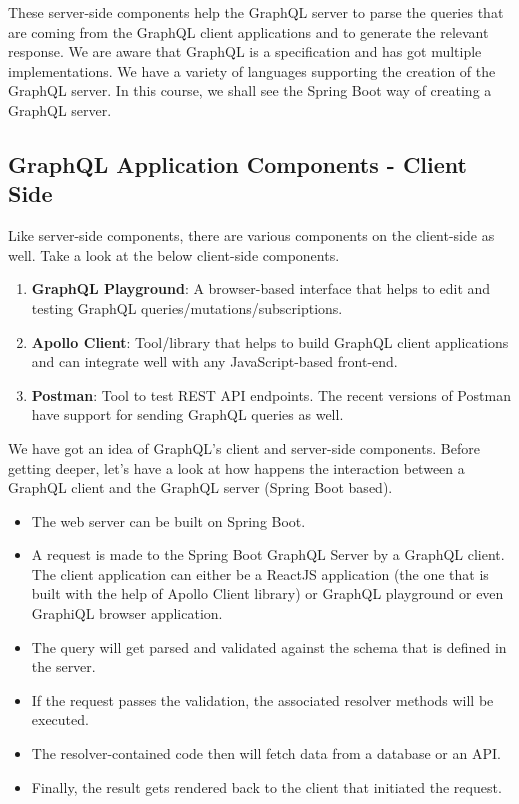 \documentclass[../main.tex]{subfiles}
\begin{document}
These server-side components help the GraphQL server to parse the queries that are coming from the GraphQL client applications and to generate the relevant response. 
We are aware that GraphQL is a specification and has got multiple implementations. We have a variety of languages supporting the creation of the GraphQL server. In this course, we shall see the Spring Boot way of creating a GraphQL server.

\subsection{GraphQL Application Components - Client Side}
Like server-side components, there are various components on the client-side as well. Take a look at the below client-side components.

\begin{enumerate}

  \item {\textbf{GraphQL Playground}: A browser-based interface that helps to edit and testing GraphQL queries/mutations/subscriptions. }
  \item {\textbf{Apollo Client}: Tool/library that helps to build GraphQL client applications and can integrate well with any JavaScript-based front-end. }
  \item {\textbf{Postman}: Tool to test REST API endpoints. The recent versions of Postman have support for sending GraphQL queries as well. }

\end{enumerate}

We have got an idea of GraphQL's client and server-side components. Before getting deeper, let's have a look at how happens the interaction between a GraphQL client and the GraphQL server (Spring Boot based).

\begin{itemize}
\item {The web server can be built on Spring Boot.}
\item {A request is made to the Spring Boot GraphQL Server by a GraphQL client. The client application can either be a ReactJS application (the one that is built with the help of Apollo Client library) or GraphQL playground or even GraphiQL browser application.}
\item {The query will get parsed and validated against the schema that is defined in the server.}
\item {If the request passes the validation, the associated resolver methods will be executed.}
\item {The resolver-contained code then will fetch data from a database or an API.}
\item {Finally, the result gets rendered back to the client that initiated the request.}
\end{itemize}

\printglossaries
\end{document}
